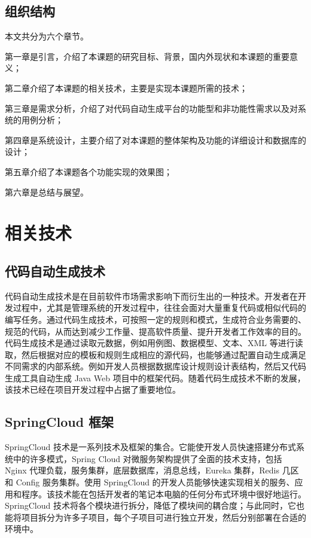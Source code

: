 \documentclass{izdthesis}
\begin{document}
\section{组织结构}
本文共分为六个章节。

第一章是引言，介绍了本课题的研究目标、背景，国内外现状和本课题的重要意义；

第二章介绍了本课题的相关技术，主要是实现本课题所需的技术；

第三章是需求分析，介绍了对代码自动生成平台的功能型和非功能性需求以及对系统的用例分析；

第四章是系统设计，主要介绍了对本课题的整体架构及功能的详细设计和数据库的设计；

第五章介绍了本课题各个功能实现的效果图；

第六章是总结与展望。

\chapter{相关技术}

\section{代码自动生成技术}
代码自动生成技术是在目前软件市场需求影响下而衍生出的一种技术。开发者在开发过程中，尤其是管理系统的开发过程中，往往会面对大量重复代码或相似代码的编写任务。通过代码生成技术，可按照一定的规则和模式，生成符合业务需要的、规范的代码，从而达到减少工作量、提高软件质量、提升开发者工作效率的目的。代码生成技术是通过读取元数据，例如用例图、数据模型、文本、XML 等进行读取，然后根据对应的模板和规则生成相应的源代码，也能够通过配置自动生成满足不同需求的内部系统\cite{ref17}。例如开发人员根据数据库设计规则设计表结构，然后又代码生成工具自动生成 Java Web 项目中的框架代码\cite{ref18}。随着代码生成技术不断的发展，该技术已经在项目开发过程中占据了重要地位。

\section{SpringCloud 框架}
SpringCloud 技术是一系列技术及框架的集合。它能使开发人员快速搭建分布式系统中的许多模式，Spring Cloud 对微服务架构提供了全面的技术支持\cite{ref19}，包括 Nginx 代理负载，服务集群，底层数据库，消息总线，Eureka 集群，Redis 几区和 Config 服务集群\cite{ref20}。使用 SpringCloud 的开发人员能够快速实现相关的服务、应用和程序。该技术能在包括开发者的笔记本电脑的任何分布式环境中很好地运行。SpringCloud 技术将各个模块进行拆分，降低了模块间的耦合度；与此同时，它也能将项目拆分为许多子项目，每个子项目可进行独立开发，然后分别部署在合适的环境中。
\end{document}

